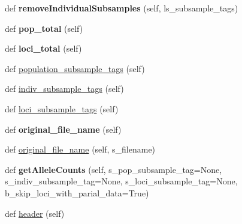 \begin{DoxyCompactItemize}
\item 
def {\bfseries remove\+Individual\+Subsamples} (self, ls\+\_\+subsample\+\_\+tags)\hypertarget{classnegui_1_1genepopfilemanager_1_1GenepopFileManager_a29bc63d2fa6273a924598b0c9a7d7742}{}\label{classnegui_1_1genepopfilemanager_1_1GenepopFileManager_a29bc63d2fa6273a924598b0c9a7d7742}

\item 
def {\bfseries pop\+\_\+total} (self)\hypertarget{classnegui_1_1genepopfilemanager_1_1GenepopFileManager_afeefa4552274231bedce1fc6b8c0532d}{}\label{classnegui_1_1genepopfilemanager_1_1GenepopFileManager_afeefa4552274231bedce1fc6b8c0532d}

\item 
def {\bfseries loci\+\_\+total} (self)\hypertarget{classnegui_1_1genepopfilemanager_1_1GenepopFileManager_a3d9ea6e211b53f43bb2b8d1c59090a6f}{}\label{classnegui_1_1genepopfilemanager_1_1GenepopFileManager_a3d9ea6e211b53f43bb2b8d1c59090a6f}

\item 
def \hyperlink{classnegui_1_1genepopfilemanager_1_1GenepopFileManager_ac3210c8f51c32e9e99e34703afb402d0}{population\+\_\+subsample\+\_\+tags} (self)
\item 
def \hyperlink{classnegui_1_1genepopfilemanager_1_1GenepopFileManager_ae77bd8c465db4d95839db838c236f4cd}{indiv\+\_\+subsample\+\_\+tags} (self)
\item 
def \hyperlink{classnegui_1_1genepopfilemanager_1_1GenepopFileManager_a9818ed890508a24026ea37fa734c898e}{loci\+\_\+subsample\+\_\+tags} (self)
\item 
def {\bfseries original\+\_\+file\+\_\+name} (self)\hypertarget{classnegui_1_1genepopfilemanager_1_1GenepopFileManager_a8145be8434d89aa7011831f6a6ca19a3}{}\label{classnegui_1_1genepopfilemanager_1_1GenepopFileManager_a8145be8434d89aa7011831f6a6ca19a3}

\item 
def \hyperlink{classnegui_1_1genepopfilemanager_1_1GenepopFileManager_abec8e261bad014e6488162ec43e63ef7}{original\+\_\+file\+\_\+name} (self, s\+\_\+filename)
\item 
def {\bfseries get\+Allele\+Counts} (self, s\+\_\+pop\+\_\+subsample\+\_\+tag=None, s\+\_\+indiv\+\_\+subsample\+\_\+tag=None, s\+\_\+loci\+\_\+subsample\+\_\+tag=None, b\+\_\+skip\+\_\+loci\+\_\+with\+\_\+parial\+\_\+data=True)\hypertarget{classnegui_1_1genepopfilemanager_1_1GenepopFileManager_a057e6970d1a5adf6a534c9ef8f2997a2}{}\label{classnegui_1_1genepopfilemanager_1_1GenepopFileManager_a057e6970d1a5adf6a534c9ef8f2997a2}

\item 
def \hyperlink{classnegui_1_1genepopfilemanager_1_1GenepopFileManager_a92fb714bb0d1caf2bc9b7c92acf48c40}{header} (self)
\end{DoxyCompactItemize}
